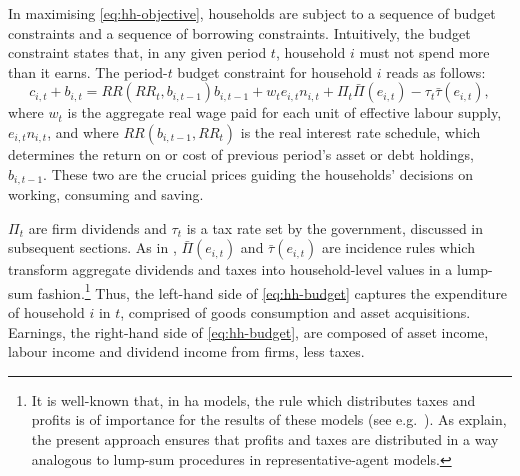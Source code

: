 \documentclass[a4paper,12pt]{article} %
\numberwithin{equation}{section} %
\numberwithin{figure}{section}
\numberwithin{table}{section}
\begin{document}
In maximising \eqref{eq:hh-objective}, households are subject to a sequence of budget constraints and a sequence of borrowing constraints. Intuitively, the budget constraint states that, in any given period $t$, household $i$ must not spend more than it earns. The period-$t$ budget constraint for household $i$ reads as follows: 
\begin{equation}
c_{i,t} + b_{i,t} = RR (RR_t, b_{i,t-1}) b_{i,t-1} + w_t e_{i,t} n_{i,t} + \Pi_t \bar{\Pi} (e_{i,t}) - \tau_t \bar{\tau} (e_{i,t}), \label{eq:hh-budget}
\end{equation}
where $w_t$ is the aggregate real wage paid for each unit of effective labour supply, $e_{i,t} n_{i,t}$, and where $RR (b_{i,t-1}, RR_t)$ is the real interest rate schedule, which determines the return on or cost of previous period's asset or debt holdings, $b_{i,t-1}$. These two are the crucial prices guiding the households' decisions on working, consuming and saving. 

$\Pi_t$ are firm dividends and $\tau_t$ is a tax rate set by the government, discussed in subsequent sections. As in \textcite{mckay2016}, $\bar{\Pi} (e_{i,t})$ and $\bar{\tau} (e_{i,t})$ are incidence rules which transform aggregate dividends and taxes into household-level values in a lump-sum fashion.\footnote{It is well-known that, in \Gls{ha} models, the rule which distributes taxes and profits is of importance for the results of these models (see e.g.~\cite{kaplan2018}). As \textcite{mckay2016} explain, the present approach ensures that profits and taxes are distributed in a way analogous to lump-sum procedures in representative-agent models.} Thus, the left-hand side of \eqref{eq:hh-budget} captures the expenditure of household $i$ in $t$, comprised of goods consumption and asset acquisitions. Earnings, the right-hand side of \eqref{eq:hh-budget}, are composed of asset income, labour income and dividend income from firms, less taxes.

\end{document}
